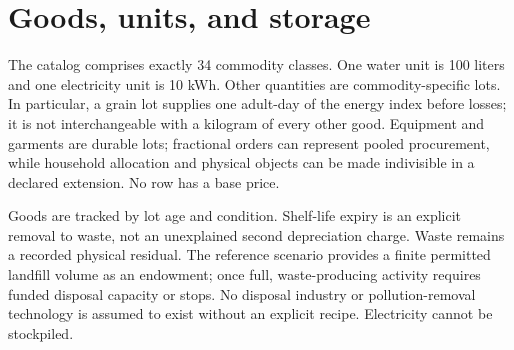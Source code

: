 \documentclass[10pt,a4paper,twocolumn]{article}
\begin{document}
\onecolumn
\appendix
\section{Goods, units, and storage}\label{app:goods}
The catalog comprises exactly 34 commodity classes. One water unit is
100 liters and one electricity unit is 10 kWh. Other quantities are
commodity-specific lots. In particular, a grain lot supplies one
adult-day of the energy index before losses; it is not interchangeable
with a kilogram of every other good. Equipment and garments are durable
lots; fractional orders can represent pooled procurement, while household
allocation and physical objects can be made indivisible in a declared
extension. No row has a base price.

Goods are tracked by lot age and condition. Shelf-life expiry is an
explicit removal to waste, not an unexplained second depreciation charge.
Waste remains a recorded physical residual. The reference scenario
provides a finite permitted landfill volume as an endowment; once full,
waste-producing activity requires funded disposal capacity or stops.
No disposal industry or pollution-removal technology is assumed to exist
without an explicit recipe. Electricity cannot be stockpiled.
\end{document}
